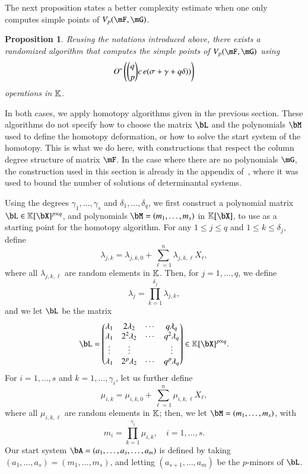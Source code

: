 \documentclass[amsthm]{elsart}
\newtheorem{proposition}[definition]{Proposition}
\begin{document}
The next proposition states a better complexity estimate when one only
computes simple points of $\VpFG{p}{\mF}{\mG}$.
\begin{proposition}\label{prop:coldeg_simple}
  Reusing the notations introduced above, 
  there exists a randomized algorithm that computes the simple points of $\VpFG{p}{\mF}{\mG}$ using
  $$ 
  {O}{\,\tilde{ }\,}\left (   {q \choose p}c \,e (\sigma+\gamma+q\delta)) \right )
  $$ 
  operations in $\mathbb{K}$.
\end{proposition}
In both cases, we apply homotopy algorithms given in the previous
section.  These algorithms do not specify how to choose the matrix
$\bL$ and the polynomials $\bM$ used to define the homotopy
deformation, or how to solve the start system of the homotopy. This is
what we do here, with constructions that respect the column degree
structure of matrix $\mF$. In the case where there are no polynomials
$\mG$, the construction used in this section is already in the
appendix of~\cite{NieRan09}, where it was used to bound the number of
solutions of determinantal systems.

Using the degrees $\gamma_1,\dots,\gamma_s$ and
$\delta_1,\dots,\delta_q$, we first construct a polynomial matrix $\bL
\in \KK[\bX]^{p \times q}$, and polynomials $\bM=(m_1,\dots,m_s)$ in
$\KK[\bX]$, to use as a starting point for the homotopy algorithm. For
any $1 \leq j \leq q$ and $1 \leq k \leq \delta_j$, define
$$\lambda_{j,k} = \lambda_{j,k,0} + \sum_{\ell =
  1}^{n}\lambda_{j,k,\ell}X_\ell,$$ where all $\lambda_{j,k,\ell}$ are
random elements in $\mathbb{K}$. Then, for $j=1,\dots,q$, we define
$$\lambda_j = \prod_{k=1}^{\delta_j}\lambda_{j,k},$$
and we let  $\bL$ be the matrix
\begin{align}\label{eqdef:col}
\bL = 
\left( \begin{matrix}
\lambda_1 & 2\lambda_2 & \cdots & q\lambda_{q}\\
\lambda_1 & 2^2\lambda_2 & \cdots & q^2\lambda_q\\
\vdots & \vdots &  & \vdots \\
\lambda_1 & 2^p\lambda_2 & \cdots & q^p\lambda_q
\end{matrix} \right) \in \KK[\bX]^{p\times q}.
\end{align}
For $i=1,\dots,s$ and $k=1,\dots,\gamma_i$, let us further define
$$\mu_{i,k} =  \mu_{i,k,0} + \sum_{\ell = 1}^{n}\mu_{i,k,\ell}X_\ell,$$ where
all $\mu_{i,k,\ell}$ are random elements in $\mathbb{K}$; then, we let
$\bM=(m_1,\dots,m_s)$, with
$$m_i=\prod_{k=1}^{\gamma_i} \mu_{i,k}, \quad i=1,\dots,s.$$ Our start
system $\bA=(a_1,\dots,a_s,\dots,a_m)$ is defined by taking
$(a_1,\dots,a_s) = (m_1,\dots,m_s)$, and letting $(a_{s+1},\dots,a_m)$
be the $p$-minors of $\bL$.
\end{document}

